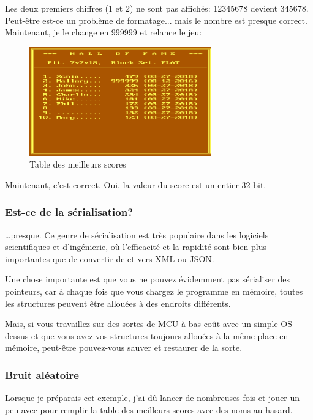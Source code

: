 Les deux premiers chiffres (1 et 2) ne sont pas affichés: 12345678 devient 345678.
Peut-être est-ce un problème de formatage... mais le nombre est presque correct.
Maintenant, je le change en 999999 et relance le jeu:

\begin{figure}[H]
\centering
\includegraphics[width=0.7\textwidth]{advanced/550_more_structs/blockout/hs999999.png}
\caption{Table des meilleurs scores}
\end{figure}

Maintenant, c'est correct. Oui, la valeur du score est un entier 32-bit.

\subsubsection{Est-ce de la sérialisation?}

\dots presque.
Ce genre de sérialisation est très populaire dans les logiciels scientifiques et
d'ingénierie, où l'efficacité et la rapidité sont bien plus importantes que de convertir
de et vers \ac{XML} ou \ac{JSON}.

Une chose importante est que vous ne pouvez évidemment pas sérialiser des pointeurs,
car à chaque fois que vous chargez le programme en mémoire, toutes les structures
peuvent être allouées à des endroits différents.

Mais, si vous travaillez sur des sortes de \ac{MCU} à bas coût avec un simple \ac{OS}
dessus et que vous avez vos structures toujours allouées à la même place en mémoire,
peut-être pouvez-vous sauver et restaurer de la sorte.

\subsubsection{Bruit aléatoire}

Lorsque je préparais cet exemple, j'ai dû lancer  de nombreuses fois
et jouer un peu avec pour remplir la table des meilleurs scores avec des noms au
hasard.

